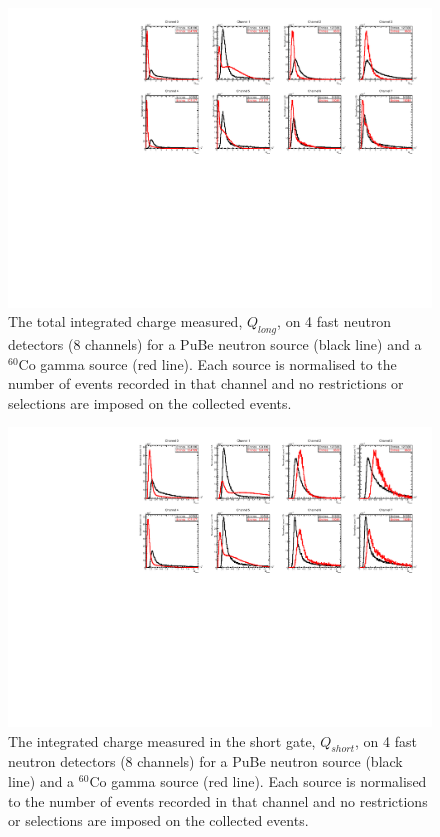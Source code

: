 \begin{figure}[htbp]
\begin{center}
\includegraphics[width=160mm]{Chapter8/figures/QLong_allChannels_pube_co60.pdf}
\caption{The total integrated charge measured, $Q_{long}$, on 4 fast neutron detectors (8 channels) for a PuBe neutron source (black line) and a $^{60}$Co gamma source (red line). Each source is normalised to the number of events recorded in that channel and no restrictions or selections are imposed on the collected events. }
\label{fig:modesQLongAllChannelsRaw}
\end{center}
\end{figure}

\begin{figure}[htbp]
\begin{center}
\includegraphics[width=160mm]{Chapter8/figures/QShort_allChannels_pube_co60.pdf}
\caption{The integrated charge measured in the short gate, $Q_{short}$, on 4 fast neutron detectors (8 channels) for a PuBe neutron source (black line) and a $^{60}$Co gamma source (red line). Each source is normalised to the number of events recorded in that channel and no restrictions or selections are imposed on the collected events.}
\label{fig:modesQShortAllChannelsRaw}
\end{center}
\end{figure}

